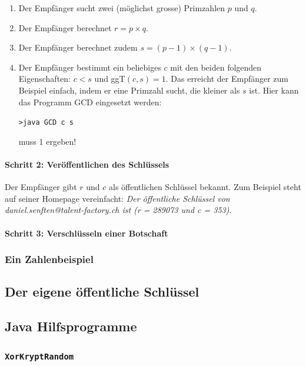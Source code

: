 \renewcommand{\theenumi}{\alph{enumi}}
\begin{enumerate}[label={\alph*)}]
    \item Der Empfänger sucht zwei (möglichst grosse) Primzahlen $p$ und $q$.
    \item Der Empfänger berechnet $r = p\times q$.
    \item Der Empfänger berechnet zudem $s = (p − 1) \times (q − 1)$.
    \item Der Empfänger bestimmt ein beliebiges $c$ mit den beiden folgenden
    Eigenschaften: $c < s$ und ggT$(c, s) = 1$. Das erreicht der Empfänger
    zum Beispiel einfach, indem er eine Primzahl sucht, die kleiner als $s$
    ist. Hier kann das Programm GCD eingesetzt werden:

    \begin{center}
        \texttt{>java GCD c s}
    \end{center}

    muss 1 ergeben!
\end{enumerate}


\paragraph*{Schritt 2: Veröffentlichen des Schlüssels}
Der Empfänger gibt $r$ und $c$ als öffentlichen Schlüssel bekannt.
Zum Beispiel steht auf seiner Homepage vereinfacht: \emph{Der öffentliche
Schlüssel von daniel.senften@talent-factory.ch ist (r = 289073 und c = 353)}.


\paragraph*{Schritt 3: Verschlüsseln einer Botschaft}


\subsubsection*{Ein Zahlenbeispiel}

\subsection{Der eigene öffentliche Schlüssel}

\subsection{Java Hilfsprogramme}
\label{subsec:java-programme}

\subsubsection*{\texttt{XorKryptRandom}}
